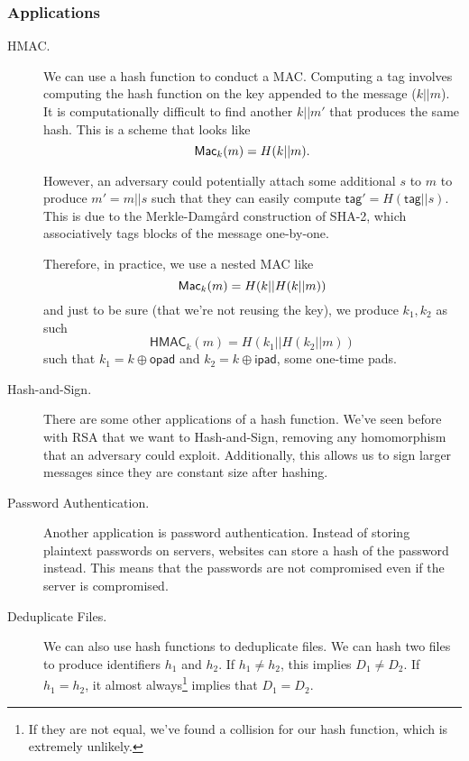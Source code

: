 \subsubsection{Applications}

\begin{description}
    \item[HMAC.] We can use a hash function to conduct a MAC. Computing a tag involves computing the hash function on the key appended to the message ($k||m$). It is computationally difficult to find another $k || m'$ that produces the same hash. This is a scheme that looks like
        \[\operatorname{\mathsf{Mac}}_k(m) = H(k||m).\]

        However, an adversary could potentially attach some additional $s$ to $m$ to produce $m' = m||s$ such that they can easily compute $\mathsf{tag}' = H(\mathsf{tag}||s)$. This is due to the Merkle-Damgård construction of SHA-2, which associatively tags blocks of the message one-by-one.


        Therefore, in practice, we use a nested MAC like
        \[\operatorname{\mathsf{Mac}}_k(m) = H(k||H(k||m))\]
        and just to be sure (that we're not reusing the key), we produce $k_1, k_2$ as such
        \[\mathsf{HMAC}_k(m) = H(k_1||H(k_2||m))\]
        such that $k_1 = k\oplus \mathsf{opad}$ and $k_2 = k\oplus\mathsf{ipad}$, some one-time pads.

    \item[Hash-and-Sign.] There are some other applications of a hash function. We've seen before with RSA that we want to Hash-and-Sign, removing any homomorphism that an adversary could exploit. Additionally, this allows us to sign larger messages since they are constant size after hashing.

    \item[Password Authentication.] Another application is password authentication. Instead of storing plaintext passwords on servers, websites can store a hash of the password instead. This means that the passwords are not compromised even if the server is compromised.

    \item[Deduplicate Files.] We can also use hash functions to deduplicate files. We can hash two files to produce identifiers $h_1$ and $h_2$. If $h_1\neq h_2$, this implies $D_1\neq D_2$. If $h_1 = h_2$, it almost always\footnote{If they are not equal, we've found a collision for our hash function, which is extremely unlikely.} implies that $D_1 = D_2$.


\end{description}
